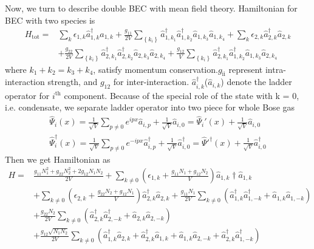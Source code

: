 Now, we turn to describe double BEC with mean field theory. Hamiltonian for BEC with two species is
\begin{equation}
\begin{split}
H_{\text{tot}}=&\sum_k\epsilon_{1,k}\hat{a}_{1,k}^\dagger\hat{a}_{1,k}+\frac{g_{11}}{2V}\sum_{\left\{k_i\right\}}\hat{a}_{1,k_1}^\dagger\hat{a}_{1,k_2}^\dagger\hat{a}_{1,k_3}\hat{a}_{1,k_4}+\sum_k\epsilon_{2,k}\hat{a}_{2,k}^\dagger\hat{a}_{2,k}\\
&+\frac{g_{22}}{2V}\sum_{\left\{k_i\right\}}\hat{a}_{2,k_1}^\dagger\hat{a}_{2,k_2}^\dagger\hat{a}_{2,k_3}\hat{a}_{2,k_4}+\frac{g_{12}}{V}\sum_{\left\{k_i\right\}}\hat{a}_{2,k_1}^\dagger\hat{a}_{1,k_2}^\dagger\hat{a}_{1,k_3}\hat{a}_{2,k_4}
\end{split}
\end{equation}
where $k_1+k_2=k_3+k_4$, satisfy momentum conservation.$g_{\text{ii}}$ represent intra-interaction strength, and $g_{12}$ for inter-interaction.
$\hat{a}_{i,k}^\dagger$($\hat{a}_{i,k}$) denote the ladder operator for $i^{\text{th}}$ component.
Because of the special role of the state with k = 0, i.e. condensate, we separate ladder operator into two piece for whole Bose gas
\begin{equation}
\begin{split}
\hat{\Psi }_i(x)=\frac{1}{\sqrt{V}}\sum_{p\neq0}e^{ipx}\hat{a}_{i,p}+\frac{1}{\sqrt{V}}\hat{a}_{i,0}=\hat{\Psi }_i'(x)+\frac{1}{\sqrt{V}}\hat{a}_{i,0}\\
\hat{\Psi }_i^\dagger(x)=\frac{1}{\sqrt{V}}\sum_{p\neq0}e^{-ipx}\hat{a}_{i,p}^\dagger+\frac{1}{\sqrt{V}}\hat{a}_{i,0}^\dagger=\hat{\Psi}'^\dagger(x)+\frac{1}{\sqrt{V}}\hat{a}_{i,0}^\dagger
\end{split}
\end{equation}
Then we get Hamiltonian as
\begin{equation}
\begin{split}
H=&\frac{g_{11}N_1^2+g_{22}N_2^2+2g_{12}N_1N_2}{2V}+\sum _{k\neq 0} \left(\epsilon_{1,k}+\frac{g_{11}N_1+g_{12}N_2}{V}\right)\hat{a}_{1,k}\dagger\hat{a}_{1,k}\\
&+\sum_{k\neq 0} \left(\epsilon_{2,k}+\frac{g_{22}N_2+g_{12}N_1}{V}\right)\hat{a}_{2,k}^\dagger\hat{a}_{2,k}+\frac{g_{11} N_1}{2V}\sum _{k\neq 0}\left(\hat{a}_{1,k}^\dagger\hat{a}_{1,-k}^\dagger+\hat{a}_{1,k}\hat{a}_{1,-k}\right)\\
&+\frac{g_{22} N_2}{2V}\sum_{k\neq0}\left(\hat{a}_{2,k}^\dagger\hat{a}_{2,-k}^\dagger+\hat{a}_{2,k}\hat{a}_{2,-k}\right)\\
&+\frac{g_{12}\sqrt{N_1N_2}}{2V}\sum _{k\neq 0} \left(\hat{a}_{1,k}^\dagger\hat{a}_{2,k}+\hat{a}_{2,k}^\dagger\hat{a}_{1,k}+\hat{a}_{1,k}\hat{a}_{2,-k}+\hat{a}_{2,k}^\dagger\hat{a}_{1,-k}^\dagger\right)
\end{split}
\end{equation}
